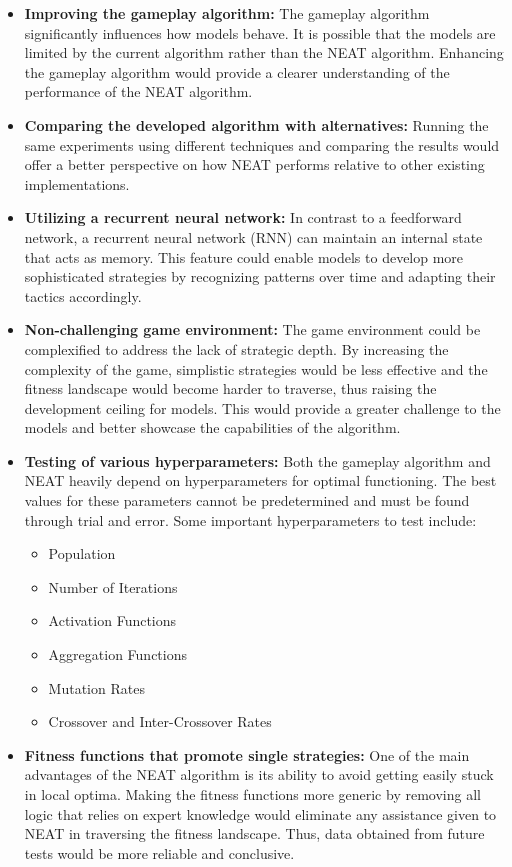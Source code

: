 \documentclass[letterpaper, 12pt]{article}
\begin{document}
\begin{itemize}
  \item \textbf{Improving the gameplay algorithm:} The gameplay algorithm significantly
    influences how models behave. It is possible that the models are limited by the
    current algorithm rather than the NEAT algorithm. Enhancing the gameplay algorithm
    would provide a clearer understanding of the performance of the  NEAT algorithm.

  \item \textbf{Comparing the developed algorithm with alternatives:} Running the same
    experiments using different techniques and comparing the results would offer a
    better perspective on how NEAT performs relative to other existing implementations.

  \item \textbf{Utilizing a recurrent neural network:} In contrast to a feedforward
    network, a recurrent neural network (RNN) can maintain an internal state that acts
    as memory. This feature could enable models to develop more sophisticated strategies
    by recognizing patterns over time and adapting their tactics accordingly.

  \item \textbf{Non-challenging game environment:} The game environment could be
    complexified to address the lack of strategic depth. By increasing the complexity of
    the game, simplistic strategies would be less effective and the fitness landscape
    would become harder to traverse, thus raising the development ceiling for models.
    This would provide a greater challenge to the models and better showcase the
    capabilities of the algorithm.

  \item \textbf{Testing of various hyperparameters:} Both the gameplay algorithm and
    NEAT heavily depend on hyperparameters for optimal functioning. The best values for
    these parameters cannot be predetermined and must be found through trial and error.
    Some important hyperparameters to test include:

    \begin{itemize}
      \item{Population}
      \item{Number of Iterations}
      \item{Activation Functions}
      \item{Aggregation Functions}
      \item{Mutation Rates}
      \item{Crossover and Inter-Crossover Rates}
    \end{itemize}

  \item \textbf{Fitness functions that promote single strategies:} One of the main
    advantages of the NEAT algorithm is its ability to avoid getting easily stuck in
    local optima. Making the fitness functions more generic by removing all logic that
    relies on expert knowledge would eliminate any assistance given to NEAT in
    traversing the fitness landscape. Thus, data obtained from future tests would be
    more reliable and conclusive.
\end{itemize}
\end{document}
